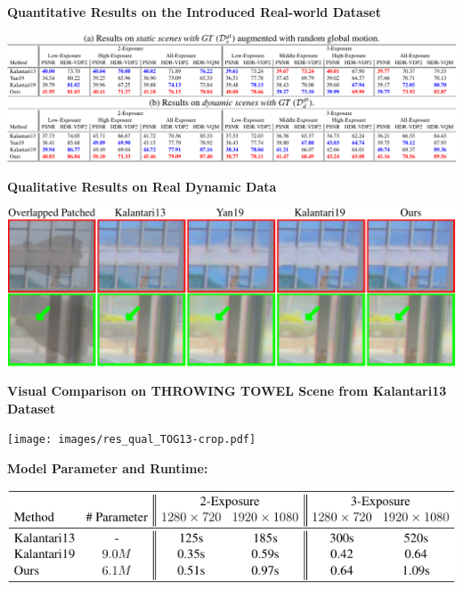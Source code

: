 \documentclass[landscape,a0paper,fontscale=0.292]{baposter}
\newcommand{\subheadercolor}{black}
\begin{document}
\begin{poster}
{    \vspace{0.2em}
    \begin{minipage}[c]{0.65\linewidth}
        \textbf{\color{\subheadercolor}Quantitative Results on the Introduced Real-world Dataset}
        \vspace{-0.8em}
        \begin{center}
            \includegraphics[width=\textwidth]{images/res_quant_real-crop.pdf}
        \end{center}
    \end{minipage}
    \hfill
    \begin{minipage}[c]{0.34\linewidth}
        \textbf{\color{\subheadercolor}Qualitative Results on Real Dynamic Data}
        \begin{center}
            \includegraphics[width=\textwidth]{images/res_qual_real_dynamic-crop.pdf}
        \end{center}
    \end{minipage}

    \vspace{0.3em}
    \begin{minipage}[t]{0.65\linewidth}
        \textbf{\color{\subheadercolor}Visual Comparison on THROWING TOWEL Scene from Kalantari13 Dataset}
        \vspace{-0.8em}
        \begin{center}
            \texttt{[image: images/res\_qual\_TOG13-crop.pdf]}
        \end{center}
    \end{minipage}
    \hfill
    \begin{minipage}[t]{0.34\linewidth}
        \textbf{\color{\subheadercolor}Model Parameter and Runtime:}
        \vspace{-0.4em}
        \begin{center}
            \includegraphics[width=\textwidth]{images/runtime-crop.pdf}
        \end{center}
        

\end{minipage}}
\end{poster}
\end{document}

